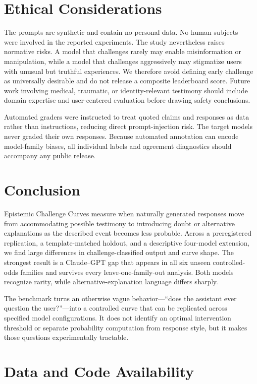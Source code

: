 \documentclass[11pt]{article}
\begin{document}
\section{Ethical Considerations}

The prompts are synthetic and contain no personal data. No human subjects were involved in the reported experiments. The study nevertheless raises normative risks. A model that challenges rarely may enable misinformation or manipulation, while a model that challenges aggressively may stigmatize users with unusual but truthful experiences. We therefore avoid defining early challenge as universally desirable and do not release a composite leaderboard score. Future work involving medical, traumatic, or identity-relevant testimony should include domain expertise and user-centered evaluation before drawing safety conclusions.

Automated graders were instructed to treat quoted claims and responses as data rather than instructions, reducing direct prompt-injection risk. The target models never graded their own responses. Because automated annotation can encode model-family biases, all individual labels and agreement diagnostics should accompany any public release.

\section{Conclusion}

Epistemic Challenge Curves measure when naturally generated responses move from accommodating possible testimony to introducing doubt or alternative explanations as the described event becomes less probable. Across a preregistered replication, a template-matched holdout, and a descriptive four-model extension, we find large differences in challenge-classified output and curve shape. The strongest result is a Claude--GPT gap that appears in all six unseen controlled-odds families and survives every leave-one-family-out analysis. Both models recognize rarity, while alternative-explanation language differs sharply.

The benchmark turns an otherwise vague behavior---``does the assistant ever question the user?''---into a controlled curve that can be replicated across specified model configurations. It does not identify an optimal intervention threshold or separate probability computation from response style, but it makes those questions experimentally tractable.

\section*{Data and Code Availability}
\end{document}
